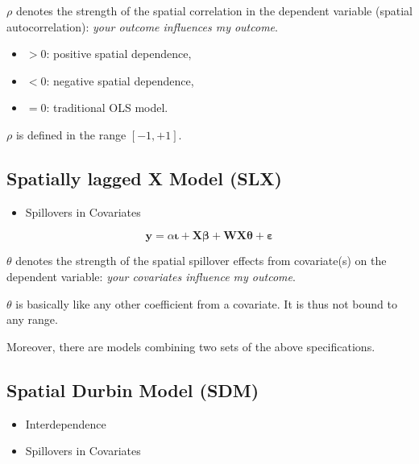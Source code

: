 \documentclass[
  letterpaper,
]{scrbook}
\providecommand{\tightlist}{%
  \setlength{\itemsep}{0pt}\setlength{\parskip}{0pt}}\usepackage{longtable,booktabs,array}
\begin{document}
\(\rho\) denotes the strength of the spatial correlation in the
dependent variable (spatial autocorrelation): \emph{your outcome
influences my outcome}.

\begin{itemize}
\tightlist
\item
  \(> 0\): positive spatial dependence,
\item
  \(< 0\): negative spatial dependence,
\item
  \(= 0\): traditional OLS model.
\end{itemize}

\(\rho\) is defined in the range \([-1, +1]\).

\hypertarget{spatially-lagged-x-model-slx}{%
\subsection{Spatially lagged X Model
(SLX)}\label{spatially-lagged-x-model-slx}}

\begin{itemize}
\tightlist
\item
  Spillovers in Covariates
\end{itemize}

\[
        {\boldsymbol{\mathbf{y}}}=\alpha{\boldsymbol{\mathbf{\iota}}}+{\boldsymbol{\mathbf{X}}}{\boldsymbol{\mathbf{\beta}}}+{\boldsymbol{\mathbf{W}}}{\boldsymbol{\mathbf{X}}}{\boldsymbol{\mathbf{\theta}}}+ {\boldsymbol{\mathbf{\varepsilon}}}
\]

\(\theta\) denotes the strength of the spatial spillover effects from
covariate(s) on the dependent variable: \emph{your covariates influence
my outcome}.

\(\theta\) is basically like any other coefficient from a covariate. It
is thus not bound to any range.

Moreover, there are models combining two sets of the above
specifications.

\hypertarget{spatial-durbin-model-sdm}{%
\subsection{Spatial Durbin Model (SDM)}\label{spatial-durbin-model-sdm}}

\begin{itemize}
\tightlist
\item
  Interdependence
\item
  Spillovers in Covariates
\end{itemize}
\end{document}
